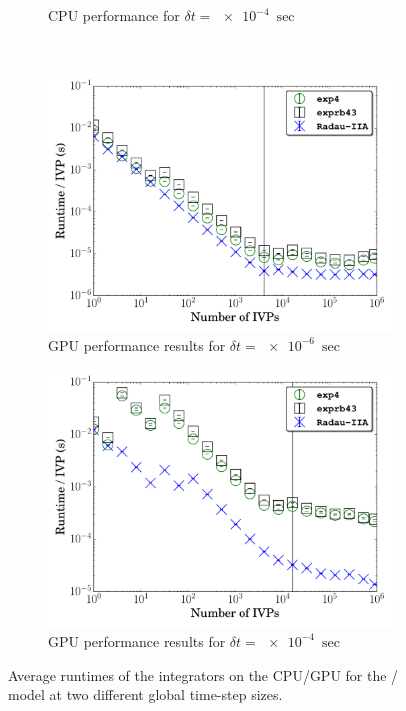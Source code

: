 \documentclass[final,twocolumn]{elsarticle}
\begin{document}
\begin{figure}[htb]
\begin{subfigure}{0.49\textwidth}
      \caption{CPU performance for $\delta t = \SI{e-4}{\sec}$}
      \label{F:h2_cpu_perf_large}
  \end{subfigure}\\
  \begin{subfigure}{0.49\textwidth}
      \includegraphics[width=\linewidth]{H2_1e-06_gpu.pdf}
      \caption{GPU performance results for $\delta t = \SI{e-6}{\sec}$}
      \label{F:h2_gpu_perf_small}
  \end{subfigure}
  \begin{subfigure}{0.49\textwidth}
      \includegraphics[width=\linewidth]{H2_1e-04_gpu.pdf}
      \caption{GPU performance results for $\delta t = \SI{e-4}{\sec}$}
      \label{F:h2_gpu_perf_large}
  \end{subfigure}
  \caption{Average runtimes of the integrators on the CPU\slash GPU for the \slash{} model at two different global time-step sizes.}
  \label{F:H2_perf}
\end{figure}
\end{document}
